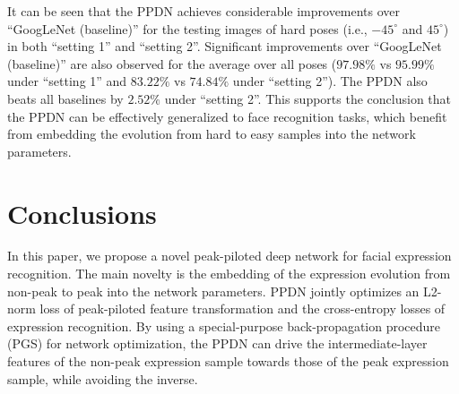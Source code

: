 \documentclass[runningheads]{llncs}
\begin{document}
It can be seen that the PPDN achieves considerable improvements over 
``GoogLeNet (baseline)'' for the testing images of hard poses 
(i.e., $-45^{\circ}$ and $45^{\circ}$) in both ``setting 1'' and ``setting 2''. 
Significant improvements over ``GoogLeNet (baseline)'' are also observed
for the average over all poses ($97.98\%$ vs $95.99\%$ under ``setting 1'' 
and $83.22\%$ vs $74.84\%$ under ``setting 2''). 
The PPDN also beats all baselines by $2.52\%$ under ``setting 2''. 
This supports the conclusion that the PPDN can be effectively generalized to 
face recognition tasks, which benefit from embedding the evolution from 
hard to easy samples into the network parameters. 






\section{Conclusions}

In this paper, we propose a novel peak-piloted deep network for facial 
expression recognition. The main novelty is the embedding of the
expression evolution from non-peak to peak into the network parameters.
PPDN jointly optimizes an L2-norm loss of peak-piloted feature 
transformation and the cross-entropy losses of expression recognition. 
By using a special-purpose back-propagation procedure (PGS) for network 
optimization, the PPDN can  drive the intermediate-layer features of the 
non-peak expression sample towards those of the peak expression sample, 
while avoiding the inverse.\\  
\end{document}
